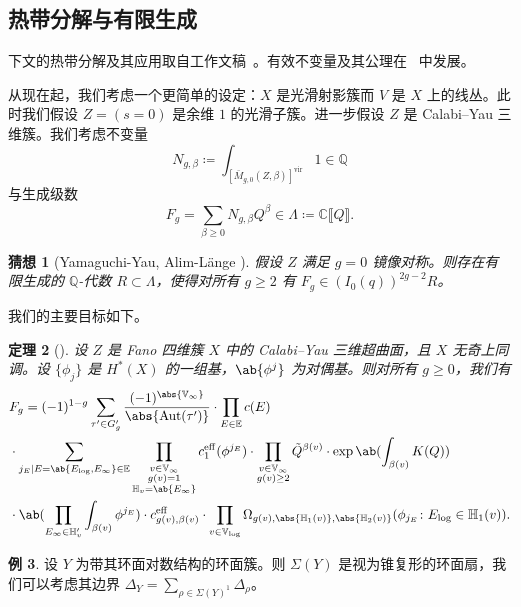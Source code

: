 \documentclass{amsart}
\newtheorem{thm}{定理}[section]
\newtheorem{conj}[thm]{猜想}
\theoremstyle{definition}
\newtheorem{exm}[thm]{例}
\theoremstyle{remark}
\theoremstyle{plain}
\theoremstyle{definition}
\theoremstyle{remark}
\newcommand{\C}{\mathbb{C}}
\newcommand{\Q}{\mathbb{Q}}
\newcommand{\E}{\mathbb{E}}
\newcommand{\V}{\mathbb{V}}
\renewcommand{\H}{\mathbb{H}}
\newcommand{\mr}[1]{\mathrm{#1}}
\newcommand{\on}[1]{\operatorname{#1}}
\newcommand{\1}{\mathbf{1}}
\newcommand{\2}{\mathbf{2}}
\newcommand{\3}{\mathbf{3}}
\newcommand{\vir}{\mr{vir}}
\newcommand{\ps}[1]{\llbracket #1 \rrbracket}
\DeclareMathOperator{\Aut}{Aut}
\begin{document}
\subsection{热带分解与有限生成}%
\label{sub:Tropical decomposition and finite generation}

下文的热带分解及其应用取自工作文稿~\cite{CJRtropical2025}。有效不变量及其公理在~\cite{CJRpunctured} 中发展。

从现在起，我们考虑一个更简单的设定：\(X\) 是光滑射影簇而 \(V\) 是 \(X\) 上的线丛。此时我们假设 \(Z = (s = 0)\) 是余维 \(1\) 的光滑子簇。进一步假设 \(Z\) 是 Calabi–Yau 三维簇。我们考虑不变量
\[ N_{g, \beta} \coloneqq \int_{[\bar{M}_{g,0}(Z, \beta)]^{\vir}} 1 \in \Q \]
与生成级数
\[ F_g = \sum_{\beta \geq 0} N_{g, \beta} Q^{\beta} \in \Lambda \coloneqq \C \ps{Q}. \]

\begin{conj}[Yamaguchi-Yau, Alim-L\"ange {\cite{YY2004,AlimLange2007}}]
    假设 \(Z\) 满足 \(g=0\) 镜像对称。则存在有限生成的 \(\Q\)-代数 \(R \subset \Lambda\)，使得对所有 \(g \geq 2\) 有 \(F_g \in (I_0(q))^{2g-2} R\)。
\end{conj}

我们的主要目标如下。

\begin{thm}[{\cite{CJRtropical2025}}]
    设 \(Z\) 是 Fano 四维簇 \(X\) 中的 Calabi–Yau 三维超曲面，且 \(X\) 无奇上同调。设 \(\{\phi_j\}\) 是 \(H^*(X)\) 的一组基，\(\ab\{\phi^j\}\) 为对偶基。则对所有 \(g \geq 0\)，我们有
    \begin{align*}
        &F_g = (-1)^{1-g} \sum_{\tau' \in G_g'} \frac{(-1)^{\abs{\V_{\infty}}}}{\abs{\Aut(\tau')}} \cdot \prod_{E \in \E} c(E) \\
        & \cdot \sum_{j_E \mid E = \ab\{E_{\log}, E_{\infty}\} \in \E} \prod_{\substack{v \in \V_{\infty} \\ g(v)=1 \\ \H_v = \ab\{E_{\infty}\}}} c_1^{\mr{eff}}(\phi^{j_E}) \cdot \prod_{\substack{v \in \V_{\infty} \\ g(v) \geq 2}} \tilde{Q}^{\beta(v)} \cdot \exp \ab(\int_{\beta(v)} K(Q) )  \\
        & \cdot \ab(\prod_{E_{\infty} \in \H_v'}\int_{\beta(v)} \phi^{j_E}) \cdot c_{g(v), \beta(v)}^{\on{eff}} 
         \cdot \prod_{v \in \V_{\log}} \Omega_{g(v), \abs{\H_1(v)}, \abs{\H_2(v)}} (\phi_{j_E} \colon E_{\log} \in \H_1(v)).
    \end{align*}
\end{thm}

\begin{exm}
    设 \(Y\) 为带其环面对数结构的环面簇。则 \(\Sigma(Y)\) 是视为锥复形的环面扇，我们可以考虑其边界 \(\Delta_Y = \sum_{\rho \in \Sigma(Y)^1} \Delta_{\rho}\)。
\end{exm}
\end{document}
